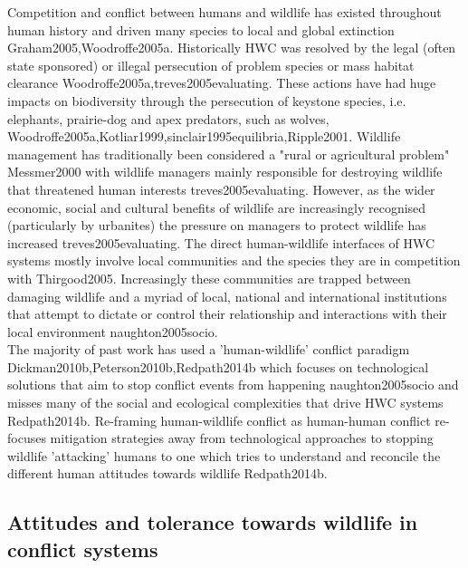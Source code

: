 Competition and conflict between humans and wildlife has existed throughout human history and driven many species to local and global extinction {Graham2005,Woodroffe2005a}. Historically HWC was resolved by the legal (often state sponsored) or illegal persecution of problem species or mass habitat clearance {Woodroffe2005a,treves2005evaluating}. These actions have had huge impacts on biodiversity through the persecution of keystone species, i.e. elephants, prairie-dog and apex predators, such as wolves, {Woodroffe2005a,Kotliar1999,sinclair1995equilibria,Ripple2001}. Wildlife management has traditionally been considered a "rural or agricultural problem" {Messmer2000} with wildlife managers mainly responsible for destroying wildlife that threatened human interests {treves2005evaluating}. However, as the wider economic, social and cultural benefits of wildlife are increasingly recognised (particularly by urbanites) the pressure on managers to protect wildlife has increased {treves2005evaluating}. The direct human-wildlife interfaces of HWC systems mostly involve local communities and the species they are in competition with {Thirgood2005}. Increasingly these communities are trapped between damaging wildlife and a myriad of local, national and international institutions that attempt to dictate or control their relationship and interactions with their local environment {naughton2005socio}.\\

The majority of past work has used a 'human-wildlife' conflict paradigm {Dickman2010b,Peterson2010b,Redpath2014b} which focuses on technological solutions that aim to stop conflict events from happening {naughton2005socio} and misses many of the social and ecological complexities that drive HWC systems {Redpath2014b}. Re-framing human-wildlife conflict as human-human conflict re-focuses mitigation strategies away from technological approaches to stopping wildlife 'attacking' humans to one which tries to understand and reconcile the different human attitudes towards wildlife {Redpath2014b}.\\

\subsection{Attitudes and tolerance towards wildlife in conflict systems}

